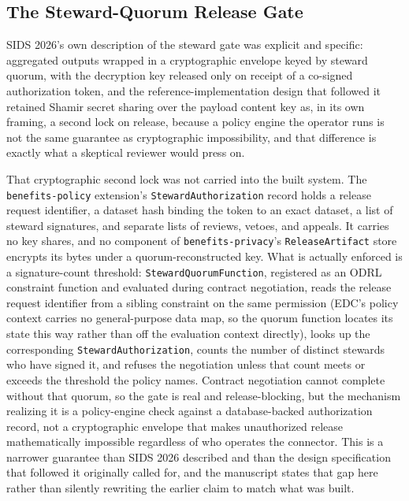 \subsection{The Steward-Quorum Release Gate}

SIDS 2026's own description of the steward gate was explicit and specific: aggregated outputs wrapped in a cryptographic envelope keyed by steward quorum, with the decryption key released only on receipt of a co-signed authorization token, and the reference-implementation design that followed it retained Shamir secret sharing over the payload content key as, in its own framing, a second lock on release, because a policy engine the operator runs is not the same guarantee as cryptographic impossibility, and that difference is exactly what a skeptical reviewer would press on.

That cryptographic second lock was not carried into the built system. The \texttt{benefits-policy} extension's \texttt{StewardAuthorization} record holds a release request identifier, a dataset hash binding the token to an exact dataset, a list of steward signatures, and separate lists of reviews, vetoes, and appeals. It carries no key shares, and no component of \texttt{benefits-privacy}'s \texttt{ReleaseArtifact} store encrypts its bytes under a quorum-reconstructed key. What is actually enforced is a signature-count threshold: \texttt{StewardQuorumFunction}, registered as an ODRL constraint function and evaluated during contract negotiation, reads the release request identifier from a sibling constraint on the same permission (EDC's policy context carries no general-purpose data map, so the quorum function locates its state this way rather than off the evaluation context directly), looks up the corresponding \texttt{StewardAuthorization}, counts the number of distinct stewards who have signed it, and refuses the negotiation unless that count meets or exceeds the threshold the policy names. Contract negotiation cannot complete without that quorum, so the gate is real and release-blocking, but the mechanism realizing it is a policy-engine check against a database-backed authorization record, not a cryptographic envelope that makes unauthorized release mathematically impossible regardless of who operates the connector. This is a narrower guarantee than SIDS 2026 described and than the design specification that followed it originally called for, and the manuscript states that gap here rather than silently rewriting the earlier claim to match what was built.

